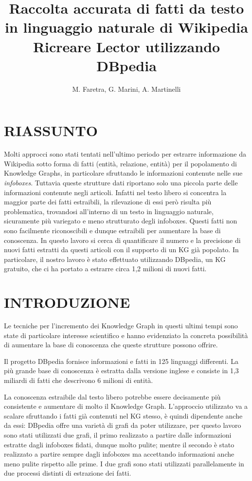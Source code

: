 \documentclass[10pt,a4paper,twocolumn]{article}
\author{M. Faretra, G. Marini, A. Martinelli}
\title{\textbf{Raccolta accurata di fatti da testo in linguaggio naturale di Wikipedia}\\Ricreare Lector utilizzando DBpedia}
\begin{document}
	
\maketitle
\pagestyle{empty}
		
\section*{RIASSUNTO}
		
Molti approcci sono stati tentati nell'ultimo periodo per estrarre informazione da Wikipedia sotto forma di fatti (entità, relazione, entità) per il popolamento di Knowledge Graphs, in particolare sfruttando le informazioni contenute nelle sue \textit{infoboxes}. Tuttavia queste strutture dati riportano solo una piccola parte delle informazioni contenute negli articoli. Infatti nel testo libero si concentra la maggior parte dei fatti estraibili, la rilevazione di essi però risulta più problematica, trovandosi all'interno di un testo in linguaggio naturale, sicuramente più variegato e meno strutturato degli infoboxes. Questi fatti non sono facilmente riconoscibili e dunque estraibili per aumentare la base di conoscenza. In questo lavoro si cerca di quantificare il numero e la precisione di nuovi fatti estratti da questi articoli con il supporto di un KG già popolato. In particolare, il nostro lavoro è stato effettuato utilizzando DBpedia, un KG gratuito, che ci ha portato a estrarre circa 1,2 milioni di nuovi fatti.

\section{INTRODUZIONE} 

Le tecniche per l'incremento dei Knowledge Graph in questi ultimi tempi sono state di particolare interesse scientifico e hanno evidenziato la concreta possibilità di aumentare la base di conoscenza che queste strutture possono offrire.

Il progetto DBpedia fornisce informazioni e fatti in 125 linguaggi differenti. La più grande base di conoscenza è estratta dalla versione inglese e consiste in 1,3 miliardi di fatti che descrivono 6 milioni di entità. 

La conoscenza estraibile dal testo libero potrebbe essere decisamente più consistente e aumentare di molto il Knowledge Graph. L'approccio utilizzato va a scalare sfruttando i fatti già contenuti nel KG stesso, è quindi dipendente anche da essi: DBpedia offre una varietà di grafi da poter utilizzare, per questo lavoro sono stati utilizzati due grafi, il primo realizzato a partire dalle informazioni estratte dagli infoboxes fidati, dunque molto pulite; mentre il secondo è stato realizzato a partire sempre dagli infoboxes ma accettando informazioni anche meno pulite rispetto alle prime. I due grafi sono stati utilizzati parallelamente in due processi distinti di estrazione dei fatti.
\end{document}
